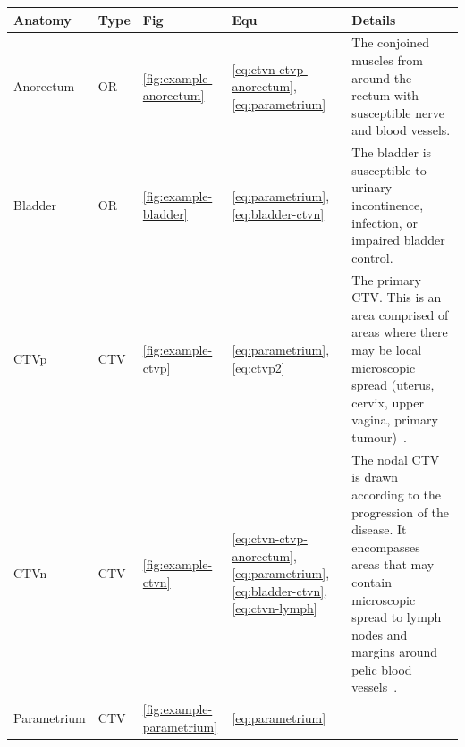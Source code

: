 \documentclass[11pt,twoside]{report}
\begin{document}
\begin{landscape}
  \begin{table}[h!]
    \centering
    \begin{tabularx}{\linewidth}{l l l l X}
      \toprule
      \textbf{Anatomy} & \textbf{Type} & \textbf{Fig} & \textbf{Equ} & \textbf{Details} \\
      \midrule
      Anorectum & OR & \ref{fig:example-anorectum} & \ref{eq:ctvn-ctvp-anorectum}, \ref{eq:parametrium} & The conjoined muscles from around the rectum with susceptible nerve and blood vessels. \\
      \midrule
      Bladder & OR & \ref{fig:example-bladder}  & \ref{eq:parametrium}, \ref{eq:bladder-ctvn} & The bladder is susceptible to urinary incontinence, infection, or impaired bladder control. \\
      \midrule     
      CTVp & CTV & \ref{fig:example-ctvp} & \ref{eq:parametrium}, \ref{eq:ctvp2} &      
      The primary CTV. This is an area comprised of areas where there may be local microscopic spread (uterus, cervix, upper vagina, primary tumour)~\cite{AMLART-data}.
      \\
      \midrule
      CTVn & CTV & \ref{fig:example-ctvn} & \ref{eq:ctvn-ctvp-anorectum}, \ref{eq:parametrium}, \ref{eq:bladder-ctvn}, \ref{eq:ctvn-lymph} & 
      
      The nodal CTV is drawn according to the progression of the disease. It encompasses areas that may contain microscopic spread to lymph nodes and margins around pelic blood vessels~\cite{AMLART-data}.
      \\
      \midrule
      Parametrium & CTV & \ref{fig:example-parametrium} & \ref{eq:parametrium} & 
      

\end{tabularx}
\end{table}
\end{landscape}
\end{document}
